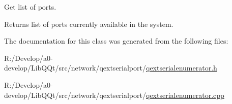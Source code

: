 Get list of ports. \begin{DoxyReturn}{Returns}
list of ports currently available in the system. 
\end{DoxyReturn}


The documentation for this class was generated from the following files\+:\begin{DoxyCompactItemize}
\item 
R\+:/\+Develop/a0-\/develop/\+Lib\+Q\+Qt/src/network/qextserialport/\mbox{\hyperlink{qextserialenumerator_8h}{qextserialenumerator.\+h}}\item 
R\+:/\+Develop/a0-\/develop/\+Lib\+Q\+Qt/src/network/qextserialport/\mbox{\hyperlink{qextserialenumerator_8cpp}{qextserialenumerator.\+cpp}}\end{DoxyCompactItemize}
